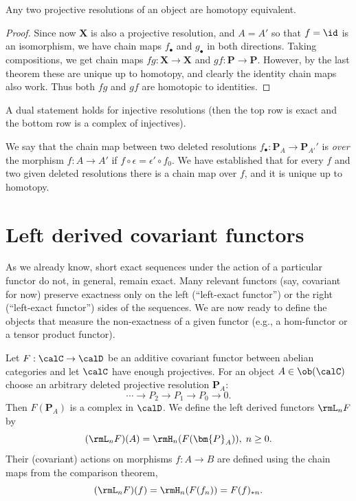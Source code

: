 \begin{cor}
    Any two projective resolutions of an object are homotopy equivalent.
\end{cor}
\begin{proof}
     Since now $\bm X$ is also a projective resolution, and $A=A'$ so that $f=\id$ is an isomorphism, we have chain maps $f_\bullet$ and $g_\bullet$ in both directions. Taking compositions, we get chain maps $fg:\bm{X}\to \bm{X}$ and $gf:\bm{P}\to \bm{P}$. However, by the last theorem these are unique up to homotopy, and clearly the identity chain maps also work. Thus both $fg$ and $gf$ are homotopic to identities.
\end{proof}

\begin{cor}\label{thm comparison for injectives}
    A dual statement holds for injective resolutions (then the top row is exact and the bottom row is a complex of injectives).
\end{cor}

\begin{defn}
    We say that the chain map between two deleted resolutions $f_\bullet:\bm{P}_A\to \bm{P}_{A'}'$ is \emph{over} the morphism $f:A\to A'$ if $f\circ \epsilon=\epsilon '\circ f_0$. We have established that for every $f$ and two given deleted resolutions there is a chain map over $f$, and it is unique up to homotopy.
\end{defn}


\section{Left derived covariant functors}

As we already know, short exact sequences under the action of a particular functor do not, in general, remain exact. Many relevant functors (say, covariant for now) preserve exactness only on the left (``left-exact functor'') or the right (``left-exact functor'') sides of the sequences. We are now ready to define the objects that measure the non-exactness of a given functor (e.g., a hom-functor or a tensor product functor).

\begin{defn}
    Let $F:\calC\to \calD$ be an additive covariant functor between abelian categories and let $\calC$ have enough projectives. For an object $A\in \ob(\calC)$ choose an arbitrary deleted projective resolution $\bm{P}_A$:
    \[\cdots \to P_2\to P_1\to P_0 \to 0.\]
    Then $F(\bm{P}_A)$ is a complex in $\calD$. We define the left derived functors $\rmL_nF$ by 
    \[(\rmL_n F) (A)=\rmH_n(F(\bm{P}_A)), \; n\geq 0.\]
    Their (covariant) actions on morphisms $f:A\to B$ are defined using the chain maps from the comparison theorem, \[(\rmL_n F)(f)=\rmH_n(F(f_n))=F(f)_{\ast n}.\]
\end{defn}

